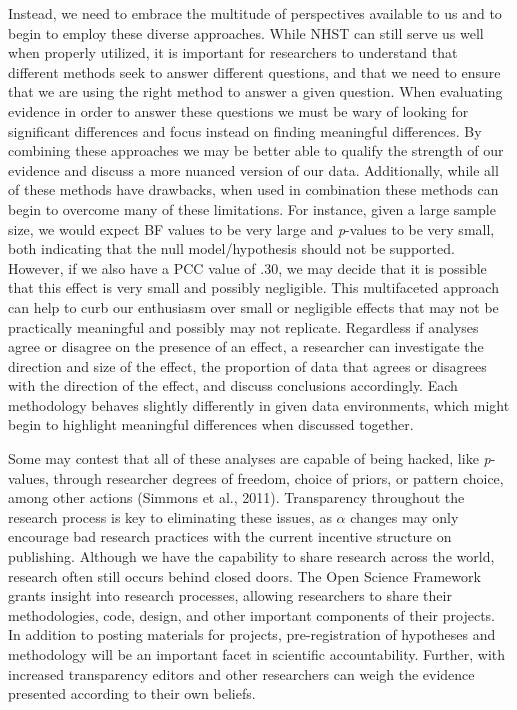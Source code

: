 \documentclass[,man, mask]{apa6}
\theoremstyle{definition}
\theoremstyle{definition}
\theoremstyle{definition}
\theoremstyle{remark}
\begin{document}
Instead, we need to embrace the multitude of perspectives available to
us and to begin to employ these diverse approaches. While NHST can still
serve us well when properly utilized, it is important for researchers to
understand that different methods seek to answer different questions,
and that we need to ensure that we are using the right method to answer
a given question. When evaluating evidence in order to answer these
questions we must be wary of looking for significant differences and
focus instead on finding meaningful differences. By combining these
approaches we may be better able to qualify the strength of our evidence
and discuss a more nuanced version of our data. Additionally, while all
of these methods have drawbacks, when used in combination these methods
can begin to overcome many of these limitations. For instance, given a
large sample size, we would expect BF values to be very large and
\emph{p}-values to be very small, both indicating that the null
model/hypothesis should not be supported. However, if we also have a PCC
value of .30, we may decide that it is possible that this effect is very
small and possibly negligible. This multifaceted approach can help to
curb our enthusiasm over small or negligible effects that may not be
practically meaningful and possibly may not replicate. Regardless if
analyses agree or disagree on the presence of an effect, a researcher
can investigate the direction and size of the effect, the proportion of
data that agrees or disagrees with the direction of the effect, and
discuss conclusions accordingly. Each methodology behaves slightly
differently in given data environments, which might begin to highlight
meaningful differences when discussed together.

Some may contest that all of these analyses are capable of being hacked,
like \emph{p}-values, through researcher degrees of freedom, choice of
priors, or pattern choice, among other actions (Simmons et al., 2011).
Transparency throughout the research process is key to eliminating these
issues, as \(\alpha\) changes may only encourage bad research practices
with the current incentive structure on publishing. Although we have the
capability to share research across the world, research often still
occurs behind closed doors. The Open Science Framework grants insight
into research processes, allowing researchers to share their
methodologies, code, design, and other important components of their
projects. In addition to posting materials for projects,
pre-registration of hypotheses and methodology will be an important
facet in scientific accountability. Further, with increased transparency
editors and other researchers can weigh the evidence presented according
to their own beliefs.
\end{document}
